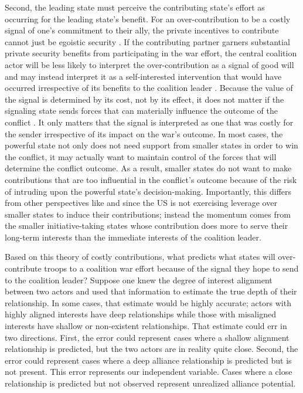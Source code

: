 \documentclass[12pt,letterpaper]{article}
\begin{document}
		Second, the leading state must perceive the contributing state's effort as occurring for the leading state's benefit. For an over-contribution to be a costly signal of one's commitment to their ally, the private incentives to contribute cannot just be egoistic security \citep{davidson_americaallieswar_2011}. If the contributing partner garners substantial private security benefits from participating in the war effort, the central coalition actor will be less likely to interpret the over-contribution as a signal of good will and may instead interpret it as a self-interested intervention that would have occurred irrespective of its benefits to the coalition leader \citep{tago_whystatesjoin_2007, lake_hierarchyinternationalrelations_2009, chapman_securingapprovaldomestic_2011}. Because the value of the signal is determined by its cost, not by its effect, it does not matter if the signaling state sends forces that can materially influence the outcome of the conflict \citep{davidson_americaallieswar_2011}. It only matters that the signal is interpreted as one that was costly for the sender irrespective of its impact on the war's outcome. In most cases, the powerful state not only does not need support from smaller states in order to win the conflict, it may actually want to maintain control of the forces that will determine the conflict outcome.  As a result, smaller states do not want to make contributions that are too influential in the conflict's outcome because of the risk of intruding upon the powerful state's decision-making. Importantly, this differs from other perspectives like \citet[72-75]{bennett_burdensharingpersiangulf_1994} and \citet{henke_buyingalliespayment_2019} since the US is not exercising leverage over smaller states to induce their contributions; instead the momentum comes from the smaller initiative-taking states whose contribution does more to serve their long-term interests than the immediate interests of the coalition leader.

		Based on this theory of costly contributions, what predicts what states will over-contribute troops to a coalition war effort because of the signal they hope to send to the coalition leader? Suppose one knew the degree of interest alignment between two actors and used that information to estimate the true depth of their relationship. In some cases, that estimate would be highly accurate; actors with highly aligned interests have deep relationships while those with misaligned interests have shallow or non-existent relationships. That estimate could err in two directions. First, the error could represent cases where a shallow alignment relationship is predicted, but the two actors are in reality quite close. Second, the error could represent cases where a deep alliance relationship is predicted but is not present. This error represents our independent variable. Cases where a close relationship is predicted but not observed represent unrealized alliance potential.
\end{document}
